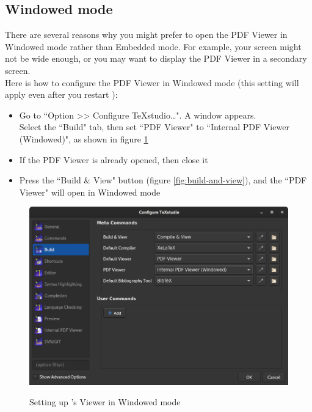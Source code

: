 \subsection{Windowed mode}

There are several reasons why you might prefer to open the PDF Viewer in Windowed mode rather than Embedded mode. For example, your screen might not be wide enough, or you may want to display the PDF Viewer in a secondary screen. \\

Here is how to configure the PDF Viewer in Windowed mode (this setting will apply even after you restart \TeXstudio):

\begin{itemize}
	\item Go to ``Option >> Configure TeXstudio\dots". A window appears. \\ 
	Select the ``Build" tab, then set ``PDF Viewer" to ``Internal PDF Viewer (Windowed)", as shown in figure \ref{fig:texstudio-configure-windowed}
	
	\item If the PDF Viewer is already opened, then close it
	
	\item Press the ``Build \& View" button (figure \ref{fig:build-and-view}), and the ``PDF Viewer" will open in Windowed mode
\end{itemize}




\begin{figure}[h]
	\caption{Setting up \TeXstudio's Viewer in Windowed mode}
	\includegraphics[keepaspectratio,width=\columnwidth]{files/texstudio-configure-windowed.png}
	\label{fig:texstudio-configure-windowed}
\end{figure}


